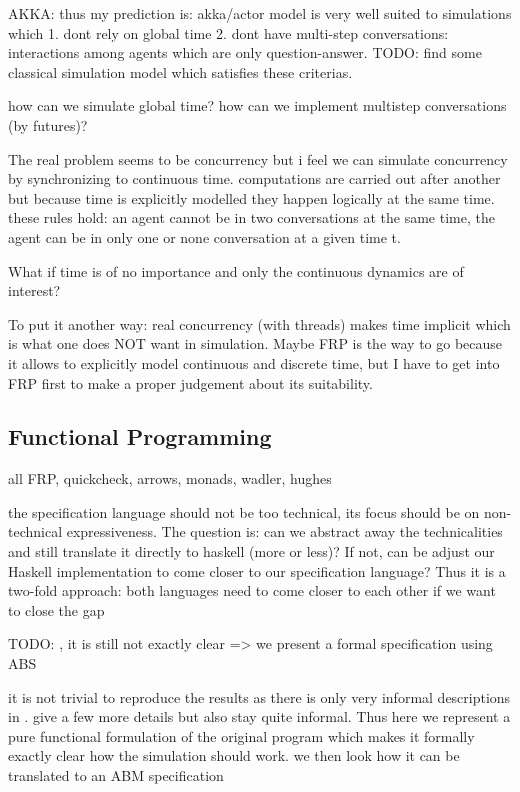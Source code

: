 AKKA: thus my prediction is: akka/actor model is very well suited to simulations which 1. dont rely on global time 2. dont have multi-step conversations: interactions among agents which are only question-answer. TODO: find some classical simulation model which satisfies these criterias.

how can we simulate global time? how can we implement multistep conversations (by futures)?

The real problem seems to be concurrency but i feel we can simulate concurrency by synchronizing to continuous time. computations are carried out after another but because time is explicitly modelled they happen logically at the same time. these rules hold: an agent cannot be in two conversations at the same time, the agent can be in only one or none conversation at a given time t.

What if time is of no importance and only the continuous dynamics are of interest?

To put it another way: real concurrency (with threads) makes time implicit which is what one does NOT want in simulation. Maybe FRP is the way to go because it allows to explicitly model continuous and discrete time, but I have to get into FRP first to make a proper judgement about its suitability.
\\

\subsection{Functional Programming}
all FRP, quickcheck, arrows, monads, wadler, hughes

 the specification language should not be too technical, its focus should be on non-technical expressiveness. The question is: can we abstract away the technicalities and still translate it directly to haskell (more or less)? If not, can be adjust our Haskell implementation to come closer to our specification language? Thus it is a two-fold approach: both languages need to come closer to each other if we want to close the gap
 
TODO: \cite{nowak_evolutionary_1992}, \cite{huberman_evolutionary_1993}
it is still not exactly clear => we present a formal specification using ABS 

it is not trivial to reproduce the results as there is only very informal descriptions in \cite{nowak_evolutionary_1992}. \cite{huberman_evolutionary_1993} give a few more details but also stay quite informal. Thus here we represent a pure functional formulation of the original program which makes it formally exactly clear how the simulation should work. we then look how it can be translated to an ABM specification

